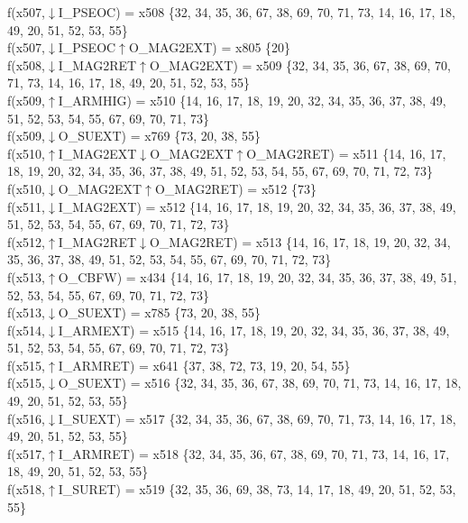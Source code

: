 f(x507,$\downarrow$I\_PSEOC) = x508 \{32, 34, 35, 36, 67, 38, 69, 70, 71, 73, 14, 16, 17, 18, 49, 20, 51, 52, 53, 55\} \\  
f(x507,$\downarrow$I\_PSEOC$\uparrow$O\_MAG2EXT) = x805 \{20\} \\  
f(x508,$\downarrow$I\_MAG2RET$\uparrow$O\_MAG2EXT) = x509 \{32, 34, 35, 36, 67, 38, 69, 70, 71, 73, 14, 16, 17, 18, 49, 20, 51, 52, 53, 55\} \\  
f(x509,$\uparrow$I\_ARMHIG) = x510 \{14, 16, 17, 18, 19, 20, 32, 34, 35, 36, 37, 38, 49, 51, 52, 53, 54, 55, 67, 69, 70, 71, 73\} \\  
f(x509,$\downarrow$O\_SUEXT) = x769 \{73, 20, 38, 55\} \\  
f(x510,$\uparrow$I\_MAG2EXT$\downarrow$O\_MAG2EXT$\uparrow$O\_MAG2RET) = x511 \{14, 16, 17, 18, 19, 20, 32, 34, 35, 36, 37, 38, 49, 51, 52, 53, 54, 55, 67, 69, 70, 71, 72, 73\} \\  
f(x510,$\downarrow$O\_MAG2EXT$\uparrow$O\_MAG2RET) = x512 \{73\} \\  
f(x511,$\downarrow$I\_MAG2EXT) = x512 \{14, 16, 17, 18, 19, 20, 32, 34, 35, 36, 37, 38, 49, 51, 52, 53, 54, 55, 67, 69, 70, 71, 72, 73\} \\  
f(x512,$\uparrow$I\_MAG2RET$\downarrow$O\_MAG2RET) = x513 \{14, 16, 17, 18, 19, 20, 32, 34, 35, 36, 37, 38, 49, 51, 52, 53, 54, 55, 67, 69, 70, 71, 72, 73\} \\  
f(x513,$\uparrow$O\_CBFW) = x434 \{14, 16, 17, 18, 19, 20, 32, 34, 35, 36, 37, 38, 49, 51, 52, 53, 54, 55, 67, 69, 70, 71, 72, 73\} \\  
f(x513,$\downarrow$O\_SUEXT) = x785 \{73, 20, 38, 55\} \\  
f(x514,$\downarrow$I\_ARMEXT) = x515 \{14, 16, 17, 18, 19, 20, 32, 34, 35, 36, 37, 38, 49, 51, 52, 53, 54, 55, 67, 69, 70, 71, 72, 73\} \\  
f(x515,$\uparrow$I\_ARMRET) = x641 \{37, 38, 72, 73, 19, 20, 54, 55\} \\  
f(x515,$\downarrow$O\_SUEXT) = x516 \{32, 34, 35, 36, 67, 38, 69, 70, 71, 73, 14, 16, 17, 18, 49, 20, 51, 52, 53, 55\} \\  
f(x516,$\downarrow$I\_SUEXT) = x517 \{32, 34, 35, 36, 67, 38, 69, 70, 71, 73, 14, 16, 17, 18, 49, 20, 51, 52, 53, 55\} \\  
f(x517,$\uparrow$I\_ARMRET) = x518 \{32, 34, 35, 36, 67, 38, 69, 70, 71, 73, 14, 16, 17, 18, 49, 20, 51, 52, 53, 55\} \\  
f(x518,$\uparrow$I\_SURET) = x519 \{32, 35, 36, 69, 38, 73, 14, 17, 18, 49, 20, 51, 52, 53, 55\} \\  
